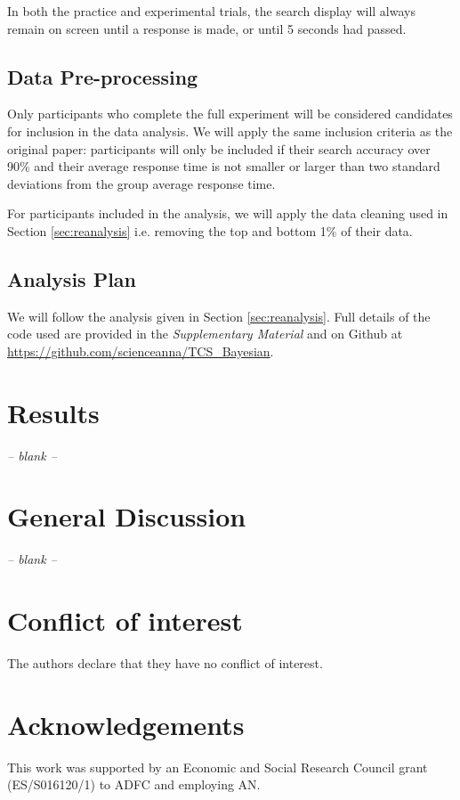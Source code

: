 \documentclass[preprint,12pt,authoryear]{elsarticle}
\begin{document}
In both the practice and experimental trials, the search display will always remain on screen until a response is made, or until 5 seconds had passed. 

\subsection{Data Pre-processing}

Only participants who complete the full experiment will be considered candidates for inclusion in the data analysis. We will apply the same inclusion criteria as the original paper: participants will only be included if their search accuracy over 90\% and their average response time is not smaller or larger than two standard deviations from the group average response time. 

For participants included in the analysis, we will apply the data cleaning used in Section \ref{sec:reanalysis} i.e. removing the top and bottom 1\% of their data.

\subsection{Analysis Plan}

We will follow the analysis given in Section \ref{sec:reanalysis}. Full details of the code used are provided in the \textit{Supplementary Material} and on Github at  
\url{https://github.com/scienceanna/TCS_Bayesian}.


\section{Results}
\begin{center}
\textit{-- blank --}
\end{center}


\section{General Discussion}
\begin{center}
\textit{-- blank --}
\end{center}




%
\section*{Conflict of interest}
The authors declare that they have no conflict of interest.

\section*{Acknowledgements}
This work was supported by an Economic and Social Research Council grant (ES/S016120/1) to ADFC and employing AN.

\end{document}
